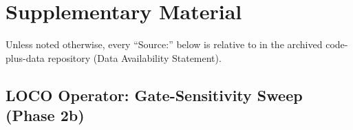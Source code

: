 \documentclass[remotesensing,article,submit,moreauthors]{Definitions/mdpi}
\begin{document}

\section{Supplementary Material}\label{app:supp}

\renewcommand{\thetable}{S\arabic{table}}
\renewcommand{\thefigure}{S\arabic{figure}}
\setcounter{table}{0}
\setcounter{figure}{0}

Unless noted otherwise, every ``Source:'' below is relative to
 in the archived code-plus-data repository (Data
Availability Statement).

\subsection{LOCO Operator: Gate-Sensitivity Sweep (Phase 2b)}\label{app:supp-s1}
\end{document}
